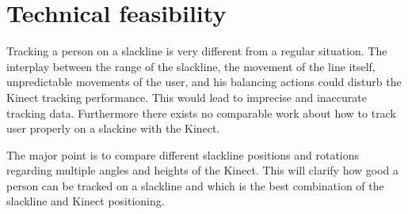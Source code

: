 \section{Technical feasibility}\label{5_1_technicalFeasibility}
Tracking a person on a slackline is very different from a regular situation.
The interplay between the range of the slackline, the movement of the line itself, unpredictable movements of the user, and his balancing actions could disturb the Kinect tracking performance. This would lead to imprecise and inaccurate tracking data. Furthermore there exists no comparable work about how to track user properly on a slackine with the Kinect.

The major point is to compare different slackline positions and rotations regarding multiple angles and heights of the Kinect. This will clarify how good a person can be tracked on a slackline and which is the best combination of the slackline and Kinect positioning.

